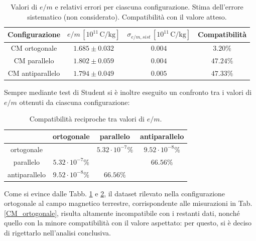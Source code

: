 \documentclass[]{article}
\begin{document}
    \begin{table}[H]
        \centering
        \begin{tabular}{||c|c|c|c||}
            \hline
            Configurazione & $e/m \, [10^{11} \,\text{C/kg}]$ & $\sigma_{e/m,sist} \,[10^{11} \,\text{C/kg}]$ & Compatibilità \\
            \hline\hline
            CM ortogonale & $1.685 \pm 0.032$ & $0.004 $ & $3.20\%$ \\\hline
            CM parallelo & $1.802 \pm 0.059$ & $0.004$ & $47.24\%$ \\\hline
            CM antiparallelo & $1.794 \pm 0.049$ & $0.005$ & $47.33\%$ \\\hline
        \end{tabular}
        \caption{Valori di $e/m$ e relativi errori per ciascuna configurazione. Stima dell'errore sistematico (non considerato). Compatibilità con il valore atteso.}
        \label{em-values}
    \end{table}
    Sempre mediante test di Student si è inoltre eseguito un confronto tra i valori di $e/m$ ottenuti da ciascuna configurazione:

    \begin{table}[H]
        \centering
        \begin{tabular}{||c|c|c|c||}
            \hline
            $ $ & ortogonale & parallelo & antiparallelo \\\hline\hline
            ortogonale & $ $ & $ 5.32\cdot 10^{-7}\% $ & $9.52\cdot 10^{-8}\%$  \\\hline
            parallelo & $ 5.32\cdot 10^{-7}\% $ & $ $ & $66.56\% $ \\\hline
            antiparallelo & $9.52\cdot 10^{-8}\% $ & $66.56\%$ & $ $ \\\hline
        \end{tabular}
        \caption{Compatibilità reciproche tra valori di $e/m$.}
        \label{comp}
    \end{table}
    Come si evince dalle Tabb. \ref{em-values} e \ref{comp}, il dataset rilevato nella configurazione ortogonale al campo magnetico terrestre, corrispondente alle misurazioni in Tab. \ref{CM_ortogonale}, risulta altamente incompatibile con i restanti dati, nonché quello con la minore compatibilità con il valore aspettato: per questo, si è deciso di rigettarlo nell'analisi conclusiva.
\end{document}
